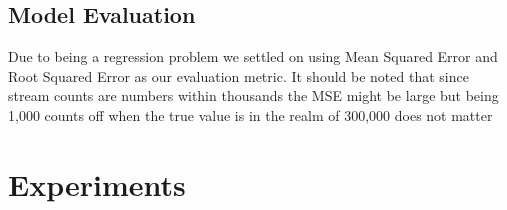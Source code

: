 \documentclass[11pt]{article}
\begin{document}
\subsection{Model Evaluation}
Due to being a regression problem we settled on using Mean Squared Error and Root Squared Error as our evaluation metric. It should be noted that since stream counts are numbers within thousands the MSE might be large but being 1,000 counts off when the true value is in the realm of 300,000 does not matter



% 
% 
% 
% 
\section{Experiments}

\end{document}
